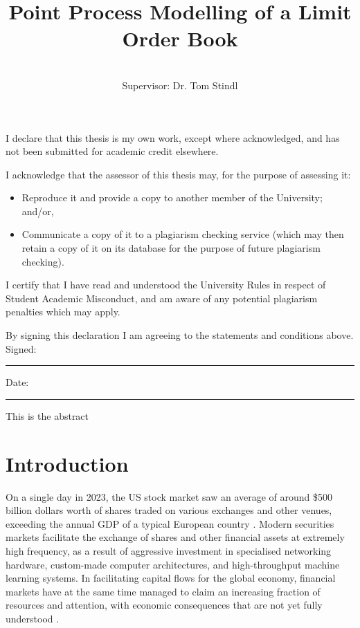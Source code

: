 \documentclass[honours,12pt]{unswthesis}
\title{Point Process Modelling of a Limit Order Book}
\author{\Authornameonly\\{\bigskip}Supervisor: Dr. Tom Stindl}
\newcommand\blankpage{%
    \null
    \thispagestyle{empty}%
    \addtocounter{page}{-1}%
    \newpage}
\numberwithin{equation}{section}
\begin{document}
\beforepreface

\afterpage{\blankpage}



\vskip 10pc \noindent I declare that this thesis is my
own work, except where acknowledged, and has not been submitted for
academic credit elsewhere. 

\vskip 2pc  \noindent I acknowledge that the assessor of this
thesis may, for the purpose of assessing it:
\begin{itemize}
\item Reproduce it and provide a copy to another member of the University; and/or,
\item Communicate a copy of it to a plagiarism checking service (which may then retain a copy of it on its database for the purpose of future plagiarism checking).
\end{itemize}

\vskip 2pc \noindent I certify that I have read and understood the University Rules in
respect of Student Academic Misconduct, and am aware of any potential plagiarism penalties which may 
apply.\vspace{24pt}

\vskip 2pc \noindent By signing 
this declaration I am
agreeing to the statements and conditions above.
\vskip 2pc \noindent
Signed: \rule{7cm}{0.25pt} \hfill Date: \rule{4cm}{0.25pt} \newline
\vskip 1pc

\afterpage{\blankpage}




\afterpage{\blankpage}



This is the abstract
\afterpage{\blankpage}


\afterpreface

\afterpage{\blankpage}

\chapter{Introduction}\label{s-intro}

{\noindent}On a single day in 2023, the US stock market saw an average of around \$500 billion dollars worth of shares traded on various exchanges and other venues, exceeding the annual GDP of a typical European country \cite{FINRA2024}. Modern securities markets facilitate the exchange of shares and other financial assets at extremely high frequency, as a result of aggressive investment in specialised networking hardware, custom-made computer architectures, and high-throughput machine learning systems. In facilitating capital flows for the global economy, financial markets have at the same time managed to claim an increasing fraction of resources and attention, with economic consequences that are not yet fully understood \cite{Palley2007}.
\end{document}
